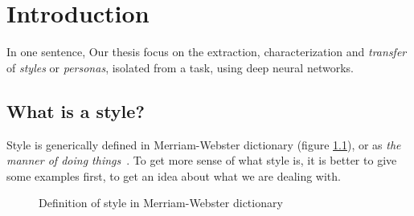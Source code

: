 \chapter{Introduction}
\minitoc%

\par In one sentence, Our thesis focus on the extraction, characterization and \textit{transfer} of \textit{styles} or \textit{personas}, isolated from a task, using deep neural networks.

\section{What is a style?}\label{sec:style}
  \par Style is generically defined in Merriam-Webster dictionary (figure \ref{fig:style_def_webster}), or as \textit{the manner of doing things}~\citep{gallaher1992individual}. To get more sense of what style is, it is better to give some examples first, to get an idea about what we are dealing with.

  \begin{figure}[!htbp]
    \centering
    \caption{Definition of style in Merriam-Webster dictionary}
    \label{fig:style_def_webster}
  \end{figure}

